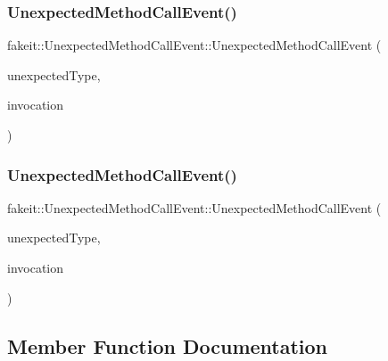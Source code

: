 \subsubsection{\texorpdfstring{UnexpectedMethodCallEvent()}{UnexpectedMethodCallEvent()}\hspace{0.1cm}{\footnotesize\ttfamily [8/9]}}
{\footnotesize\ttfamily fakeit\+::\+Unexpected\+Method\+Call\+Event\+::\+Unexpected\+Method\+Call\+Event (\begin{DoxyParamCaption}\item[{\mbox{\hyperlink{namespacefakeit_ae284671dc00c0fa5ee2aa4a6af02743b}{Unexpected\+Type}}}]{unexpected\+Type,  }\item[{const \mbox{\hyperlink{structfakeit_1_1Invocation}{Invocation}} \&}]{invocation }\end{DoxyParamCaption})\hspace{0.3cm}{\ttfamily [inline]}}

\mbox{\label{structfakeit_1_1UnexpectedMethodCallEvent_a57007d208f8ad119bbc5fedb744440cc}} 
\subsubsection{\texorpdfstring{UnexpectedMethodCallEvent()}{UnexpectedMethodCallEvent()}\hspace{0.1cm}{\footnotesize\ttfamily [9/9]}}
{\footnotesize\ttfamily fakeit\+::\+Unexpected\+Method\+Call\+Event\+::\+Unexpected\+Method\+Call\+Event (\begin{DoxyParamCaption}\item[{\mbox{\hyperlink{namespacefakeit_ae284671dc00c0fa5ee2aa4a6af02743b}{Unexpected\+Type}}}]{unexpected\+Type,  }\item[{const \mbox{\hyperlink{structfakeit_1_1Invocation}{Invocation}} \&}]{invocation }\end{DoxyParamCaption})\hspace{0.3cm}{\ttfamily [inline]}}



\subsection{Member Function Documentation}
\mbox{\label{structfakeit_1_1UnexpectedMethodCallEvent_a80a3e753a6163cecbb4d6f1b75a03f9f}} 
